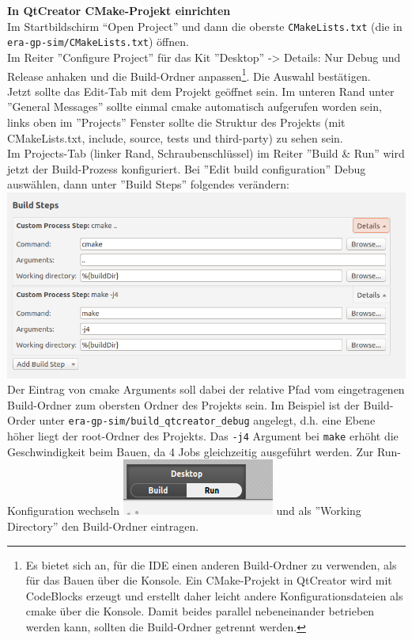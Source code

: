\textbf{In QtCreator CMake-Projekt einrichten}\\
Im Startbildschirm ``Open Project'' und dann die oberste \texttt{CMakeLists.txt}
(die in \texttt{era-gp-sim/CMakeLists.txt}) öffnen.\\ Im Reiter ''Configure
Project'' für das Kit ''Desktop'' -> Details: Nur Debug und Release anhaken und
die Build-Ordner anpassen\footnote{Es bietet sich an, für die IDE einen anderen
Build-Ordner zu verwenden, als für das Bauen über die Konsole. Ein CMake-Projekt
in QtCreator wird mit CodeBlocks erzeugt und erstellt daher leicht andere
Konfigurationsdateien als cmake über die Konsole. Damit beides parallel
nebeneinander betrieben werden kann, sollten die Build-Ordner getrennt werden.}.
Die Auswahl bestätigen.\\ Jetzt sollte das Edit-Tab mit dem Projekt geöffnet
sein. Im unteren Rand unter ''General Messages'' sollte einmal cmake automatisch
aufgerufen worden sein, links oben im ''Projects'' Fenster sollte die Struktur
des Projekts (mit CMakeLists.txt, include, source, tests und third-party) zu
sehen sein.\\ Im Projects-Tab (linker Rand, Schraubenschlüssel) im Reiter
''Build \& Run'' wird jetzt der Build-Prozess konfiguriert. Bei ''Edit build
configuration'' Debug auswählen, dann unter ''Build Steps'' folgendes
verändern:\\
\includegraphics[scale=0.5]{images/setup-qtcreator-buildrun-config.png}\\ Der
Eintrag von cmake Arguments soll dabei der relative Pfad vom eingetragenen
Build-Ordner zum obersten Ordner des Projekts sein. Im Beispiel ist der
Build-Order unter \texttt{era-gp-sim/build\_qtcreator\_debug} angelegt, d.h.
eine Ebene höher liegt der root-Ordner des Projekts. Das \texttt{-j4} Argument
bei \texttt{make} erhöht die Geschwindigkeit beim Bauen, da 4 Jobs gleichzeitig
ausgeführt werden. Zur Run-Konfiguration wechseln
\includegraphics[scale=1.0]{images/setup-qtcreator-run-config} und als ''Working
Directory'' den Build-Ordner eintragen.\\

